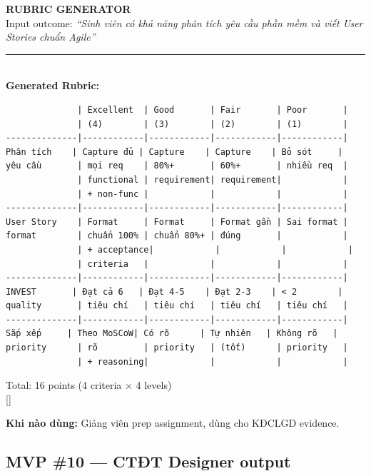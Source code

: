 \documentclass[11pt,a4paper]{article}
\begin{document}
\begin{mockbox}
{\bfseries\color{ink} RUBRIC GENERATOR}\\[6pt]
{\color{mid} Input outcome:} \textit{``Sinh viên có khả năng phân tích yêu cầu phần mềm và viết User Stories chuẩn Agile''}\\[6pt]
\rule{\linewidth}{0.3pt}\\[4pt]
{\bfseries\color{ink} Generated Rubric:}\\[4pt]
\begin{verbatim}
              | Excellent  | Good       | Fair       | Poor       |
              | (4)        | (3)        | (2)        | (1)        |
--------------|------------|------------|------------|------------|
Phân tích    | Capture đủ | Capture    | Capture    | Bỏ sót     |
yêu cầu       | mọi req    | 80%+       | 60%+       | nhiều req  |
              | functional | requirement| requirement|            |
              | + non-func |            |            |            |
--------------|------------|------------|------------|------------|
User Story    | Format     | Format     | Format gần | Sai format |
format        | chuẩn 100% | chuẩn 80%+ | đúng       |            |
              | + acceptance|            |            |            |
              | criteria   |            |            |            |
--------------|------------|------------|------------|------------|
INVEST       | Đạt cả 6   | Đạt 4-5    | Đạt 2-3    | < 2        |
quality       | tiêu chí   | tiêu chí   | tiêu chí   | tiêu chí   |
--------------|------------|------------|------------|------------|
Sắp xếp     | Theo MoSCoW| Có rõ      | Tự nhiên   | Không rõ   |
priority      | rõ         | priority   | (tốt)      | priority   |
              | + reasoning|            |            |            |
\end{verbatim}
\textcolor{mid}{Total: 16 points (4 criteria × 4 levels)}\\[6pt]
{[]  }
\end{mockbox}

\textbf{Khi nào dùng:} Giảng viên prep assignment, dùng cho KĐCLGD evidence.

\subsection{MVP \#10 --- CTĐT Designer output}
\end{document}
